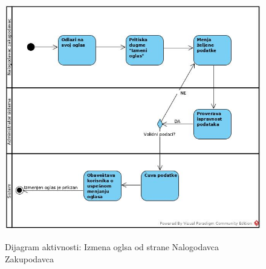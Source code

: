 \documentclass[20pt]{article}
\begin{document}
\begin{figure}[h]
		\centering
		\includegraphics[width=1.1\textwidth,height=0.59\textheight]{Pictures/IzmenaOglasaOdStraneKorisnika.jpg}\\
		\caption{Dijagram aktivnosti: Izmena oglsa od strane Nalogodavca Zakupodavca}
		\label{fig:dijagramAktivnostiIzmeneOglasa}
	\end{figure}
\newpage
\end{document}
